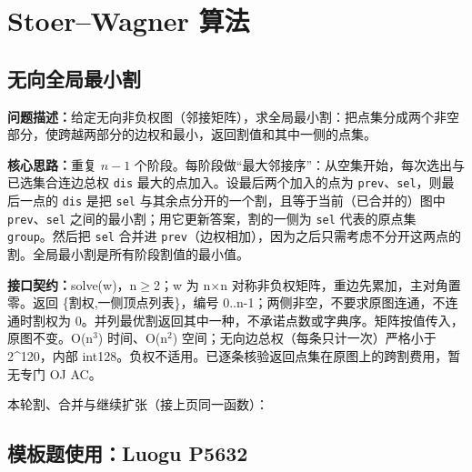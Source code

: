 \section{Stoer–Wagner 算法}

\subsection{无向全局最小割}\label{compact-StoerWagner}

\noindent\textbf{问题描述：}\allowbreak 给定无向非负权图（邻接矩阵），求全局最小割：把点集分成两个非空部分，使跨越两部分的边权和最小，返回割值和其中一侧的点集。

\textbf{核心思路：}\allowbreak 重复 $n-1$ 个阶段。每阶段做“最大邻接序”：从空集开始，每次选出与已选集合连边总权 \texttt{dis} 最大的点加入。设最后两个加入的点为 \texttt{prev}、\texttt{sel}，则最后一点的 \texttt{dis} 是把 \texttt{sel} 与其余点分开的一个割，且等于当前（已合并的）图中 \texttt{prev}、\texttt{sel} 之间的最小割；用它更新答案，割的一侧为 \texttt{sel} 代表的原点集 \texttt{group}。然后把 \texttt{sel} 合并进 \texttt{prev}（边权相加），因为之后只需考虑不分开这两点的割。全局最小割是所有阶段割值的最小值。



{\sloppy{}\noindent\textbf{接口契约：}solve(w)，n$\ge$2；w 为 n×n 对称非负权矩阵，重边先累加，主对角置零。返回 \{割权,一侧顶点列表\}，编号 0..n-1；两侧非空，不要求原图连通，不连通时割权为 0。并列最优割返回其中一种，不承诺点数或字典序。矩阵按值传入，原图不变。O(n$^{3}$) 时间、O(n$^{2}$) 空间；无向边总权（每条只计一次）严格小于 2\textasciicircum{}120，内部 int128。负权不适用。已逐条核验返回点集在原图上的跨割费用，暂无专门 OJ AC。\par}

\Needspace{360pt}



\newpage

\noindent 本轮割、合并与继续扩张（接上页同一函数）：



\Needspace{493pt}

\subsection*{模板题使用：Luogu P5632}

\label{usage-example-150}

